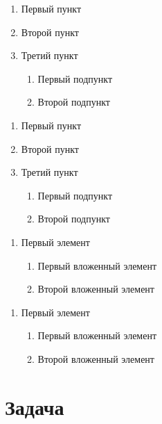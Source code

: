 \documentclass[12pt, a4paper]{article}
\theoremstyle{plain}              %
\theoremstyle{definition}         %
\begin{document}
\begin{enumerate}
\item Первый пункт
\item Второй пункт
\item Третий пункт
\begin{enumerate}
\item Первый подпункт
\item Второй подпункт
\end{enumerate}
\end{enumerate}

\begin{enumerate}
	\renewcommand{\labelenumi}{\Roman{enumi}}
	\renewcommand{\labelenumii}{\asbuk{enumii}}
\item Первый пункт
\item Второй пункт
\item Третий пункт
\begin{enumerate}
\item Первый подпункт
\item Второй подпункт
\end{enumerate}
\end{enumerate}


\begin{enumerate}
\item Первый элемент
  \begin{enumerate}
  \item Первый вложенный элемент
  \item Второй вложенный элемент
  \end{enumerate}
\end{enumerate}

\renewcommand{\labelenumi}{\arabic{enumi}}
\renewcommand{\labelenumii}{\arabic{enumi}.\arabic{enumii}}

\begin{enumerate}
\item Первый элемент
  \begin{enumerate}
  \item Первый вложенный элемент
  \item Второй вложенный элемент
  \end{enumerate}
\end{enumerate}



\section{Задача}
\end{document}
